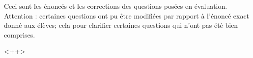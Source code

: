 

\begin{center}
    Ceci sont les énoncés et les corrections des questions posées en évaluation. Attention : certaines questions ont pu être modifiées par rapport à l'énoncé exact donné aux élèves; cela pour clarifier certaines questions qui n'ont pas été bien comprises.
\end{center}
<++>

